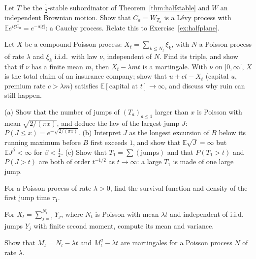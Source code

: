 \begin{exercise}[$\star\star$]\label{ex:cauchy}
Let $T$ be the $\frac12$-stable subordinator of Theorem~\ref{thm:halfstable} and $W$ an independent Brownian motion. Show that $C_a=W_{T_a}$ is a L\'evy process with $\mathbb Ee^{i\xi C_a}=e^{-a|\xi|}$: a Cauchy process. Relate this to
Exercise~\ref{ex:halfplane}.
\end{exercise}

\begin{exercise}[$\star\star$]\label{ex:compound}
Let $X$ be a compound Poisson process: $X_t=\sum_{k\le N_t}\xi_k$, with $N$ a Poisson process of rate $\lambda$ and $\xi_k$ i.i.d.\ with law $\nu$, independent of $N$. Find its triple, and show that if $\nu$ has a finite mean $m$, then $X_t-\lambda mt$
is a martingale. With $\nu$ on $]0,\infty[$, $X$ is the total claim of an insurance company; show that $u+ct-X_t$ (capital $u$, premium rate $c>\lambda m$) satisfies $\mathbb E[\text{capital at }t]\to\infty$, and discuss why ruin can still happen.
\end{exercise}

\begin{exercise}[$\star\star\star$]\label{ex:excursions}
(a) Show that the number of jumps of $(T_a)_{a\le1}$ larger than $x$ is Poisson with mean $\sqrt{2/(\pi x)}$, and deduce the law of the largest jump $J$: $P(J\le x)=e^{-\sqrt{2/(\pi x)}}$.
(b) Interpret $J$ as the longest excursion of $B$ below its running maximum before $B$ first exceeds $1$, and show that $\mathbb E\sqrt{J}=\infty$ but $\mathbb EJ^{\beta}<\infty$ for $\beta<\frac12$.
(c) Show that $T_1=\sum(\text{jumps})$ and that $P(T_1>t)$ and $P(J>t)$ are both of order $t^{-1/2}$ as $t\to\infty$: a large $T_1$ is made of one large jump.
\end{exercise}

\begin{exercise}[$\star$]\label{ex:v12poissonfirst}
For a Poisson process of rate $\lambda>0$, find the survival function and density of the first jump time $\tau_1$.
\end{exercise}

\begin{exercise}[$\star$]\label{ex:v12compoundmoments}
For $X_t=\sum_{j=1}^{N_t}Y_j$, where $N_t$ is Poisson with mean $\lambda t$ and independent of i.i.d. jumps $Y_j$ with finite second moment, compute its mean and variance.
\end{exercise}

\begin{exercise}[$\star\star$]\label{ex:v12compensatedN}
Show that $M_t=N_t-\lambda t$ and $M_t^2-\lambda t$ are martingales for a Poisson process $N$ of rate $\lambda$.
\end{exercise}

